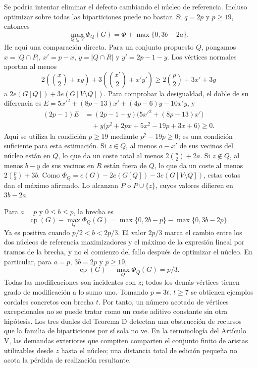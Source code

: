 \documentclass[spanish,11pt,a4paper]{article}
\begin{document}
Se podría intentar eliminar el defecto cambiando el núcleo de
referencia. Incluso optimizar sobre todas las biparticiones puede no
bastar. Si \(q=2p\) y \(p\ge19\), entonces \[
\max_{Q\subseteq V}\Phi_Q(G)=\Phi+\max\{0,3b-2a\}.
\] He aquí una comparación directa. Para un conjunto propuesto \(Q\),
pongamos \(x=|Q\cap P|\), \(x'=p-x\), \(y=|Q\cap R|\) y \(y'=2p-1-y\).
Los vértices normales aportan al menos \[
2\left(\binom x2+xy\right)
+3\left(\binom{x'}2+x'y'\right)
\ge 2\binom p2+3x'+3y
\] a \(2e(G[Q])+3e(G[V\setminus Q])\). Para comprobar la desigualdad, el
doble de su diferencia es \(E=5x'^2+(8p-13)x'+(4p-6)y-10x'y\), y \[
\begin{aligned}
(2p-1)E&=(2p-1-y)\bigl(5x'^2+(8p-13)x'\bigr)\\
&\quad+y\bigl(p^2+2px+5x^2-19p+3x+6\bigr)\ge0.
\end{aligned}
\] Aquí se utiliza la condición \(p\ge19\) mediante \(p^2-19p\ge0\); es
una condición suficiente para esta estimación. Si \(z\in Q\), al menos
\(a-x'\) de sus vecinos del núcleo están en \(Q\), lo que da un coste
total al menos \(2\binom p2+2a\). Si \(z\notin Q\), al menos \(b-y\) de
sus vecinos en \(R\) están fuera de \(Q\), lo que da un coste al menos
\(2\binom p2+3b\). Como \(\Phi_Q=e(G)-2e(G[Q])-3e(G[V\setminus Q])\),
estas cotas dan el máximo afirmado. Lo alcanzan \(P\) o \(P\cup\{z\}\),
cuyos valores difieren en \(3b-2a\).

Para \(a=p\) y \(0\le b\le p\), la brecha es \[
\operatorname{cp}(G)-\max_Q\Phi_Q(G)
=\max\{0,2b-p\}-\max\{0,3b-2p\}.
\] Ya es positiva cuando \(p/2<b<2p/3\). El valor \(2p/3\) marca el
cambio entre los dos núcleos de referencia maximizadores y el máximo de
la expresión lineal por tramos de la brecha, y no el comienzo del fallo
después de optimizar el núcleo. En particular, para \(a=p\), \(3b=2p\) y
\(p\ge19\), \[
\operatorname{cp}(G)-\max_Q\Phi_Q(G)=p/3.
\] Todas las modificaciones son incidentes con \(z\); todos los demás
vértices tienen grado de modificación a lo sumo uno. Tomando \(p=3t\),
\(t\ge7\) se obtienen ejemplos cordales concretos con brecha \(t\). Por
tanto, un número acotado de vértices excepcionales no se puede tratar
como un coste aditivo constante sin otra hipótesis. Los tres duales del
Teorema D detectan una obstrucción de recursos que la familia de
biparticiones por sí sola no ve. En la terminología del Artículo V, las
demandas exteriores que compiten comparten el conjunto finito de aristas
utilizables desde \(z\) hasta el núcleo; una distancia total de edición
pequeña no acota la pérdida de realización resultante.
\end{document}
